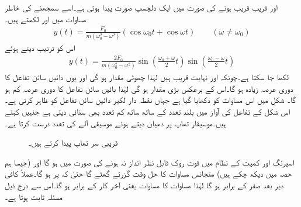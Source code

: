  اور  قریب قریب ہونے کی صورت میں ایک دلچسپ صورت پیدا ہوتی ہے۔اسے سمجھنے کی خاطر مساوات  میں  اور  لکھتے ہیں۔
\begin{align}\label{مساوات_سادہ_دو_تھاپ_الف}
y(t)=\frac{F_0}{m(\omega_0^2-\omega^2)}(\cos \omega_0 t+\cos \omega t)\quad \quad (\omega \ne \omega_0)
\end{align}
اس کو ترتیب دیتے ہوئے
\begin{align}\label{مساوات_سادہ_دو_تھاپ_ب}
y(t)=\frac{2F_0}{m(\omega_0^2-\omega^2)}\sin\left( \frac{\omega_0+\omega}{2}t\right)\sin\left( \frac{\omega_0-\omega}{2}t\right)
\end{align}
لکھا جا سکتا ہے۔چونکہ  اور  نہایت قریب ہیں لہٰذا  چھوٹی مقدار ہو گی اور یوں دائیں سائن تفاعل کا دوری عرصہ زیادہ ہو گا۔اس کے برعکس  بڑی مقدار ہو گی لہٰذا بائیں سائن تفاعل کا دوری عرصہ کم ہو گا۔ شکل  میں اس مساوات کو دکھایا گیا ہے جہاں نقطہ دار لکیر دائیں سائن تفاعل کو ظاہر کرتی ہے۔اس شکل کے تفاعل کی آواز میں بلند تعدد کے ساتھ ساتھ کم تعدد بھی سنائی دیتی ہے جنہیں  کہتے ہیں۔موسیقار  تھاپ پر دھیان دیتے ہوئے موسیقی آلے  کی تعدد درست کرتا ہے۔
\begin{figure}
\centering
{}
\caption{قریبی سر تھاپ پیدا کرتے ہیں۔}
\label{شکل_سادہ_دو_گمک_تھاپ}
\end{figure}

اسپرنگ اور کمیت کے نظام میں قوت روک قابل نظر انداز نہ ہونے کی صورت میں  ہو گا اور (جیسا ہم حصہ  میں دیکھ چکے ہیں) متجانس مساوات  کا حل  وقت گزرتے  گھٹے گا حتیٰ کہ  پر  ہو گا۔عملاً کافی دیر بعد  صفر کے برابر ہو گا لہٰذا مساوات  کا   مساوات  یعنی  آخر کار    کے برابر ہو گا۔اس سے درج ذیل مسئلہ ثابت ہوتا ہے۔

